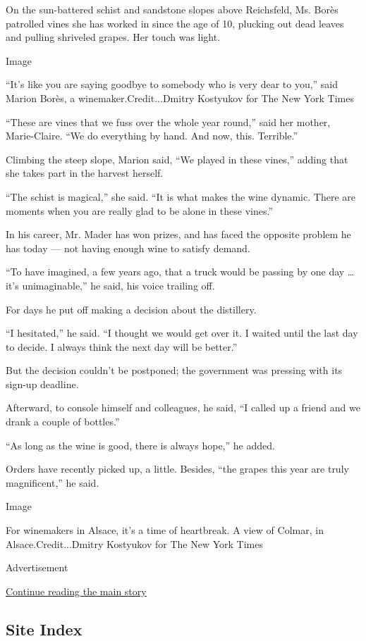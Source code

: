 On the sun-battered schist and sandstone slopes above Reichsfeld, Ms.
Borès patrolled vines she has worked in since the age of 10, plucking
out dead leaves and pulling shriveled grapes. Her touch was light.

Image

``It's like you are saying goodbye to somebody who is very dear to
you,'' said Marion Borès, a winemaker.Credit...Dmitry Kostyukov for The
New York Times

``These are vines that we fuss over the whole year round,'' said her
mother, Marie-Claire. ``We do everything by hand. And now, this.
Terrible.''

Climbing the steep slope, Marion said, ``We played in these vines,''
adding that she takes part in the harvest herself.

``The schist is magical,'' she said. ``It is what makes the wine
dynamic. There are moments when you are really glad to be alone in these
vines.''

In his career, Mr. Mader has won prizes, and has faced the opposite
problem he has today --- not having enough wine to satisfy demand.

``To have imagined, a few years ago, that a truck would be passing by
one day \ldots{} it's unimaginable,'' he said, his voice trailing off.

For days he put off making a decision about the distillery.

``I hesitated,'' he said. ``I thought we would get over it. I waited
until the last day to decide. I always think the next day will be
better.''

But the decision couldn't be postponed; the government was pressing with
its sign-up deadline.

Afterward, to console himself and colleagues, he said, ``I called up a
friend and we drank a couple of bottles.''

``As long as the wine is good, there is always hope,'' he added.

Orders have recently picked up, a little. Besides, ``the grapes this
year are truly magnificent,'' he said.

Image

For winemakers in Alsace, it's a time of heartbreak. A view of Colmar,
in Alsace.Credit...Dmitry Kostyukov for The New York Times

Advertisement

\protect\hyperlink{after-bottom}{Continue reading the main story}

\hypertarget{site-index}{%
\subsection{Site Index}\label{site-index}}

